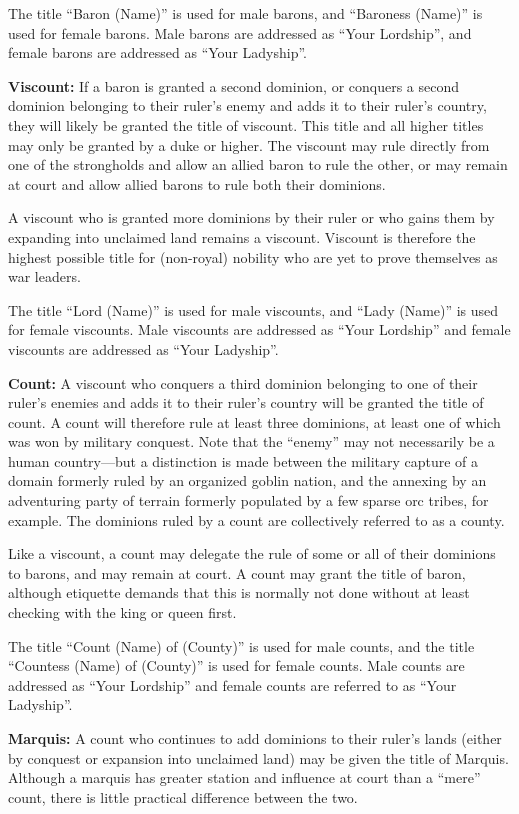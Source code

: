 \begin{multicols*}{2}
The title “Baron (Name)” is used for male barons, and “Baroness (Name)” is used for female barons. Male barons are addressed as “Your Lordship”, and female barons are addressed as “Your Ladyship”.

\textbf{Viscount:} If a baron is granted a second dominion, or conquers a second dominion belonging to their ruler’s enemy and adds it to their ruler’s country, they will likely be granted the title of viscount. This title and all higher titles may only be granted by a duke or higher. The viscount may rule directly from one of the strongholds and allow an allied baron to rule the other, or may remain at court and allow allied barons to rule both their dominions.

A viscount who is granted more dominions by their ruler or who gains them by expanding into unclaimed land remains a viscount. Viscount is therefore the highest possible title for (non-royal) nobility who are yet to prove themselves as war leaders.

The title “Lord (Name)” is used for male viscounts, and “Lady (Name)” is used for female viscounts. Male viscounts are addressed as “Your Lordship” and female viscounts are addressed as “Your Ladyship”.

\textbf{Count:} A viscount who conquers a third dominion belonging to one of their ruler’s enemies and adds it to their ruler’s country will be granted the title of count. A count will therefore rule at least three dominions, at least one of which was won by military conquest. Note that the “enemy” may not necessarily be a human country—but a distinction is made between the military capture of a domain formerly ruled by an organized goblin nation, and the annexing by an adventuring party of terrain formerly populated by a few sparse orc tribes, for example. The dominions ruled by a count are collectively referred to as a county.

Like a viscount, a count may delegate the rule of some or all of their dominions to barons, and may remain at court. A count may grant the title of baron, although etiquette demands that this is normally not done without at least checking with the king or queen first.

The title “Count (Name) of (County)” is used for male counts, and the title “Countess (Name) of (County)” is used for female counts. Male counts are addressed as “Your Lordship” and female counts are referred to as “Your Ladyship”.

\textbf{Marquis:} A count who continues to add dominions to their ruler’s lands (either by conquest or expansion into unclaimed land) may be given the title of Marquis. Although a marquis has greater station and influence at court than a “mere” count, there is little practical difference between the two.


\end{multicols*}
